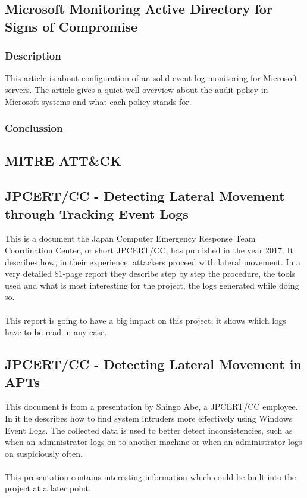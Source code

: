 \subsection{Microsoft Monitoring Active Directory for Signs of Compromise
}%
\subsubsection{Description}
This article \cite{MSADSignsOfCompromise} is about configuration of an solid event log monitoring for Microsoft servers. The article gives a quiet well overview about the audit policy in Microsoft systems and what each policy stands for. 

\subsubsection{Conclussion}

\subsection{MITRE ATT\&CK}

\subsection{JPCERT/CC - Detecting Lateral Movement through Tracking Event Logs}
This is a document the Japan Computer Emergency Response Team Coordination Center, or short JPCERT/CC, has published in the year 2017. It describes how, in their experience, attackers proceed with lateral movement. In a very detailed 81-page report they describe step by step the procedure, the tools used and what is most interesting for the project, the logs generated while doing so. \ \\
\ \\
This report is going to have a big impact on this project, it shows which logs have to be read in any case.

\subsection{JPCERT/CC - Detecting Lateral Movement in APTs}
This document is from a presentation by Shingo Abe, a JPCERT/CC employee. In it he describes how to find system intruders more effectively using Windows Event Logs. The collected data is used to better detect inconsistencies, such as when an administrator logs on to another machine or when an administrator logs on suspiciously often. \ \\
\ \\
This presentation contains interesting information which could be built into the project at a later point.

